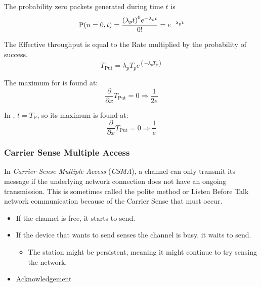 The probability zero packets generated during time $t$ is
\begin{equation*}
  \operatorname{\operatorname{P}}(n = 0, t) = \frac{{\left( \lambda_{p}t \right)}^{0} e^{-\lambda_{p}t}}{0!} = e^{-\lambda_{p}t}
\end{equation*}

The Effective throughput is equal to the Rate multiplied by the probability of success.
\begin{equation*}
  T_{\mathrm{Put}} = \lambda_{p}T_{p}e^{(-\lambda_{p}T_{p})}
\end{equation*}

The maximum for  is found at:
\begin{equation*}
  \frac{\partial}{\partial x} T_{\mathrm{Put}} = 0 \Rightarrow \frac{1}{2e}
\end{equation*}

In , $t = T_{\mathrm{P}}$, so its maximum is found at:
\begin{equation*}
  \frac{\partial}{\partial x} T_{\mathrm{Put}} = 0 \Rightarrow \frac{1}{e}
\end{equation*}

\subsubsection{Carrier Sense Multiple Access}\label{subsubsec:CSMA}
\begin{definition}\label{def:CSMA}
  In \emph{Carrier Sense Multiple Access} (\emph{CSMA}), a channel can only transmit its message if the underlying network connection does not have an ongoing transmission.
  This is sometimes called the polite method or Listen Before Talk network communication because of the Carrier Sense that must occur.
  \begin{itemize}[noitemsep]
  \item If the channel is free, it starts to send.
  \item If the device that wants to send senses the channel is busy, it waits to send.
    \begin{itemize}[noitemsep]
    \item The station might be persistent, meaning it might continue to try sensing the network.
    \end{itemize}

  \item Acknowledgement
  \end{itemize}
\end{definition}

